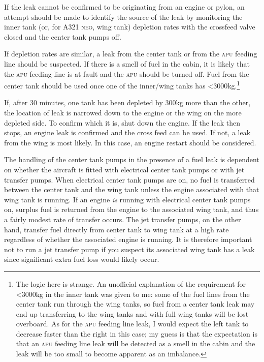 \documentclass[a5paper,11pt,twoside]{book}
\newcommand{\ac}[1]{{\scshape\MakeLowercase{#1}}}
\begin{document}
If the leak cannot be confirmed to be originating from an engine or pylon, an
attempt should be made to identify the source of the leak by monitoring the
inner tank (or, for A321 \ac{NEO}, wing tank) depletion rates with the crossfeed
valve closed and the center tank pumps off.

If depletion rates are similar, a leak from the center tank or from the \ac{APU}
feeding line should be suspected. If there is a smell of fuel in the cabin, it
is likely that the \ac{APU} feeding line is at fault and the \ac{APU} should be
turned off. Fuel from the center tank should be used once one of the inner/wing
tanks has <3000kg.\footnote{The logic here is strange. An unofficial explanation
of the requirement for <3000kg in the inner tank was given to me: some of the
fuel lines from the center tank run through the wing tanks, so fuel from a
center tank leak may end up transferring to the wing tanks and with full wing
tanks will be lost overboard. As for the \ac{APU} feeding line leak, I would
expect the left tank to decrease faster than the right in this case; my guess is
that the expectation is that an \ac{APU} feeding line leak will be detected as a
smell in the cabin and the leak will be too small to become apparent as an
imbalance.}

If, after 30 minutes, one tank has been depleted by 300kg more than the other,
the location of leak is narrowed down to the engine or the wing on the more
depleted side. To confirm which it is, shut down the engine.  If the leak then
stops, an engine leak is confirmed and the cross feed can be used. If not, a
leak from the wing is most likely. In this case, an engine restart should be
considered.

The handling of the center tank pumps in the presence of a fuel leak is
dependent on whether the aircraft is fitted with electrical center tank pumps or
with jet transfer pumps. When electrical center tank pumps are on, no fuel is
transferred between the center tank and the wing tank unless the engine
associated with that wing tank is running. If an engine \emph{is} running with
electrical center tank pumps on, surplus fuel is returned from the engine to the
associated wing tank, and thus a fairly modest rate of transfer occurs. The jet
transfer pumps, on the other hand, transfer fuel directly from center tank to
wing tank at a high rate regardless of whether the associated engine is
running. It is therefore important not to run a jet transfer pump if you suspect
its associated wing tank has a leak since significant extra fuel loss would
likely occur.
\end{document}
